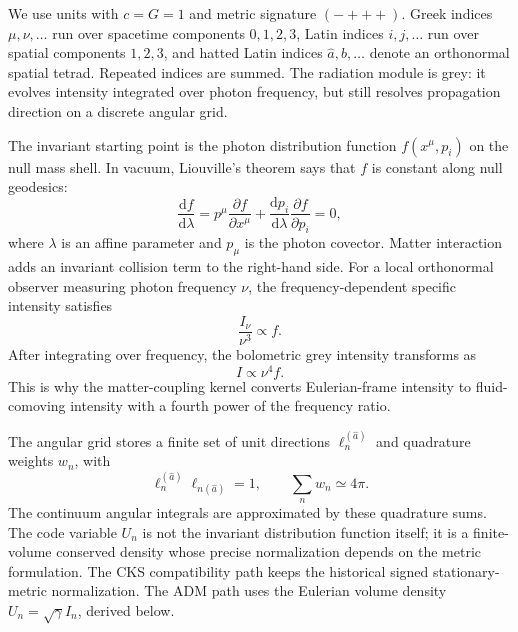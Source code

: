 \documentclass[11pt]{article}
\newcommand{\dd}{\mathrm{d}}
\begin{document}
We use units with \(c=G=1\) and metric signature \((-+++) \).  Greek indices
\(\mu,\nu,\ldots\) run over spacetime components \(0,1,2,3\), Latin indices
\(i,j,\ldots\) run over spatial components \(1,2,3\), and hatted Latin indices
\(\hat a,\hat b,\ldots\) denote an orthonormal spatial tetrad.  Repeated
indices are summed.  The radiation module is grey: it evolves intensity
integrated over photon frequency, but still resolves propagation direction on
a discrete angular grid.

The invariant starting point is the photon distribution function \(f(x^\mu,p_i)\)
on the null mass shell.  In vacuum, Liouville's theorem says that \(f\) is
constant along null geodesics:
\begin{equation}
  \frac{\dd f}{\dd \lambda}
  =
  p^\mu\frac{\partial f}{\partial x^\mu}
  +\frac{\dd p_i}{\dd \lambda}\frac{\partial f}{\partial p_i}
  =0,
  \label{eq:liouville}
\end{equation}
where \(\lambda\) is an affine parameter and \(p_\mu\) is the photon covector.
Matter interaction adds an invariant collision term to the right-hand side.
For a local orthonormal observer measuring photon frequency \(\nu\), the
frequency-dependent specific intensity satisfies
\begin{equation}
  \frac{I_\nu}{\nu^3} \propto f .
\end{equation}
After integrating over frequency, the bolometric grey intensity transforms as
\begin{equation}
  I \propto \nu^4 f .
  \label{eq:bolometric_transform}
\end{equation}
This is why the matter-coupling kernel converts Eulerian-frame intensity to
fluid-comoving intensity with a fourth power of the frequency ratio.

The angular grid stores a finite set of unit directions
\(\ell_n^{(\hat a)}\) and quadrature weights \(w_n\), with
\begin{equation}
  \ell_n^{(\hat a)}\ell_{n(\hat a)}=1,\qquad
  \sum_n w_n \simeq 4\pi .
\end{equation}
The continuum angular integrals are approximated by these quadrature sums.
The code variable \(U_n\) is not the invariant distribution function itself; it
is a finite-volume conserved density whose precise normalization depends on
the metric formulation.  The CKS compatibility path keeps the historical signed
stationary-metric normalization.  The ADM path uses the Eulerian volume density
\(U_n=\sqrt{\gamma}I_n\), derived below.
\end{document}
